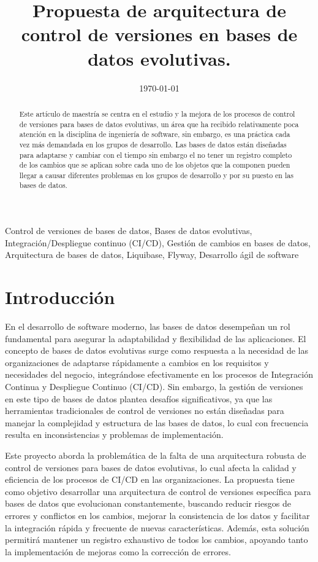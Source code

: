 \documentclass{IEEEtran}
\title{Propuesta de arquitectura de control de versiones en bases de datos evolutivas.}
\author{\IEEEauthorblockN{ Gerardo Adolfo Salas Montoya}
\IEEEauthorblockA{\\Maestría en ingeniería de software con énfasis en arquitectura y diseño de software.\\
Universidad Cenfotec\\
San Jose, Costa Rica\\
Email: gsalasm@ucenfotec.ac.cr }}
\date{\today}
\begin{document}
\maketitle

\begin{abstract}
    Este artículo de maestría se centra en el estudio y la mejora de los procesos de control de versiones para bases de datos evolutivas, un área que ha recibido relativamente poca atención en la disciplina de ingeniería de software, sin embargo, es una práctica cada vez más demandada en los grupos de desarrollo. Las bases de datos están diseñadas para adaptarse y cambiar con el tiempo sin embargo el no tener un registro completo de los cambios que se aplican sobre cada uno de los objetos que la componen pueden llegar a causar diferentes problemas en los grupos de desarrollo y por su puesto en las bases de datos.
\end{abstract}
    
\begin{IEEEkeywords}
    Control de versiones de bases de datos,
    Bases de datos evolutivas,
    Integración/Despliegue continuo (CI/CD),
    Gestión de cambios en bases de datos,
    Arquitectura de bases de datos,
    Liquibase,
    Flyway,
    Desarrollo ágil de software
\end{IEEEkeywords}

\section{Introducción}
En el desarrollo de software moderno, las bases de datos desempeñan un rol fundamental para asegurar la adaptabilidad y flexibilidad de las aplicaciones. El concepto de bases de datos evolutivas surge como respuesta a la necesidad de las organizaciones de adaptarse rápidamente a cambios en los requisitos y necesidades del negocio, integrándose efectivamente en los procesos de Integración Continua y Despliegue Continuo (CI/CD). Sin embargo, la gestión de versiones en este tipo de bases de datos plantea desafíos significativos, ya que las herramientas tradicionales de control de versiones no están diseñadas para manejar la complejidad y estructura de las bases de datos, lo cual con frecuencia resulta en inconsistencias y problemas de implementación.

Este proyecto aborda la problemática de la falta de una arquitectura robusta de control de versiones para bases de datos evolutivas, lo cual afecta la calidad y eficiencia de los procesos de CI/CD en las organizaciones. La propuesta tiene como objetivo desarrollar una arquitectura de control de versiones específica para bases de datos que evolucionan constantemente, buscando reducir riesgos de errores y conflictos en los cambios, mejorar la consistencia de los datos y facilitar la integración rápida y frecuente de nuevas características. Además, esta solución permitirá mantener un registro exhaustivo de todos los cambios, apoyando tanto la implementación de mejoras como la corrección de errores.
\end{document}
